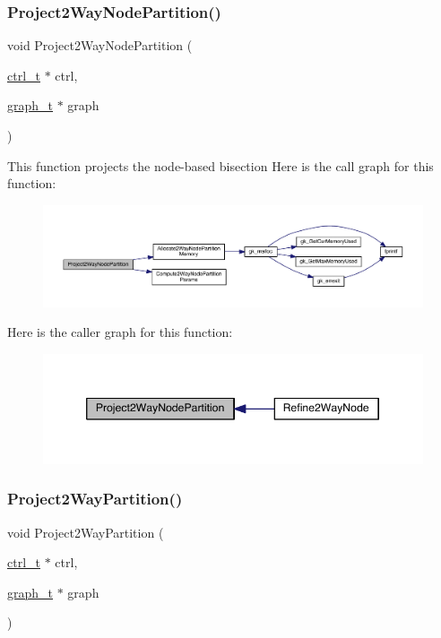 \subsubsection{\texorpdfstring{Project2\+Way\+Node\+Partition()}{Project2WayNodePartition()}}
{\footnotesize\ttfamily void Project2\+Way\+Node\+Partition (\begin{DoxyParamCaption}\item[{\hyperlink{a00742}{ctrl\+\_\+t} $\ast$}]{ctrl,  }\item[{\hyperlink{a00734}{graph\+\_\+t} $\ast$}]{graph }\end{DoxyParamCaption})}

This function projects the node-\/based bisection Here is the call graph for this function\+:\nopagebreak
\begin{figure}[H]
\begin{center}
\leavevmode
\includegraphics[width=350pt]{a00945_ab3d791e7adffa770602e257ecdaabd72_cgraph}
\end{center}
\end{figure}
Here is the caller graph for this function\+:\nopagebreak
\begin{figure}[H]
\begin{center}
\leavevmode
\includegraphics[width=346pt]{a00945_ab3d791e7adffa770602e257ecdaabd72_icgraph}
\end{center}
\end{figure}
\mbox{\label{a00945_a99814e73a646480f8af05e7d8bcfe4bc}} 
\subsubsection{\texorpdfstring{Project2\+Way\+Partition()}{Project2WayPartition()}}
{\footnotesize\ttfamily void Project2\+Way\+Partition (\begin{DoxyParamCaption}\item[{\hyperlink{a00742}{ctrl\+\_\+t} $\ast$}]{ctrl,  }\item[{\hyperlink{a00734}{graph\+\_\+t} $\ast$}]{graph }\end{DoxyParamCaption})}

